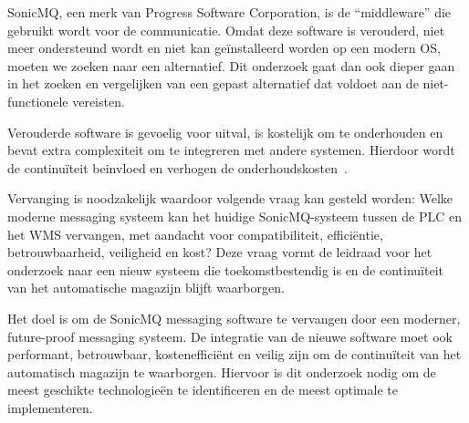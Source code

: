SonicMQ, een merk van Progress Software Corporation, is de ``middleware'' die gebruikt wordt voor de communicatie.
Omdat deze software is verouderd, niet meer ondersteund wordt en niet kan geïnstalleerd worden op een modern OS, moeten we zoeken naar een alternatief.
Dit onderzoek gaat dan ook dieper gaan in het zoeken en vergelijken van een gepast alternatief dat voldoet aan de niet-functionele vereisten.
\newline
 
Verouderde software is gevoelig voor uitval, is kostelijk om te onderhouden en bevat extra complexiteit om te integreren met andere systemen.
Hierdoor wordt de continuïteit beinvloed en verhogen de onderhoudskosten~\autocite{Khadka2016}.
\newline
 

Vervanging is noodzakelijk waardoor volgende vraag kan gesteld worden: 
Welke moderne messaging systeem kan het huidige SonicMQ-systeem tussen de PLC en het WMS vervangen, 
met aandacht voor compatibiliteit, efficiëntie, betrouwbaarheid, veiligheid en kost?
Deze vraag vormt de leidraad voor het onderzoek naar een nieuw systeem die toekomstbestendig is 
en de continuïteit van het automatische magazijn blijft waarborgen.
\newline

Het doel is om de SonicMQ messaging software te vervangen door een moderner, future-proof messaging systeem.
De integratie van de nieuwe software moet ook performant, betrouwbaar, kostenefficiënt en veilig zijn 
om de continuïteit van het automatisch magazijn te waarborgen. 
Hiervoor is dit onderzoek nodig om de meest geschikte technologieën te identificeren en de meest optimale te implementeren.



\section{}%
\label{sec:probleemstelling}

